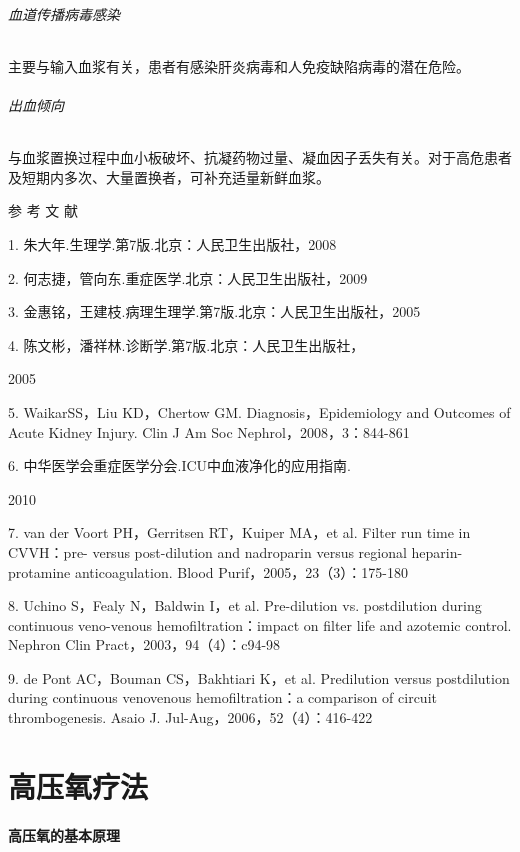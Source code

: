 \subparagraph{血道传播病毒感染}

主要与输入血浆有关，患者有感染肝炎病毒和人免疫缺陷病毒的潜在危险。

\subparagraph{出血倾向}

与血浆置换过程中血小板破坏、抗凝药物过量、凝血因子丢失有关。对于高危患者及短期内多次、大量置换者，可补充适量新鲜血浆。

\protect\hypertarget{text00394.html}{}{}

\hypertarget{text00394.htmlux5cux23CHP16-10-5}{}
参 考 文 献

1. 朱大年.生理学.第7版.北京：人民卫生出版社，2008

2. 何志捷，管向东.重症医学.北京：人民卫生出版社，2009

3. 金惠铭，王建枝.病理生理学.第7版.北京：人民卫生出版社，2005

4. 陈文彬，潘祥林.诊断学.第7版.北京：人民卫生出版社，

2005

5. WaikarSS，Liu KD，Chertow GM. Diagnosis，Epidemiology and Outcomes of
Acute Kidney Injury. Clin J Am Soc Nephrol，2008，3：844-861

6. 中华医学会重症医学分会.ICU中血液净化的应用指南.

2010

7. van der Voort PH，Gerritsen RT，Kuiper MA，et al. Filter run time in
CVVH：pre- versus post-dilution and nadroparin versus regional
heparin-protamine anticoagulation. Blood Purif，2005，23（3）：175-180

8. Uchino S，Fealy N，Baldwin I，et al. Pre-dilution vs. postdilution
during continuous veno-venous hemofiltration：impact on filter life and
azotemic control. Nephron Clin Pract，2003，94（4）：c94-98

9. de Pont AC，Bouman CS，Bakhtiari K，et al. Predilution versus
postdilution during continuous venovenous hemofiltration：a comparison
of circuit thrombogenesis. Asaio J. Jul-Aug，2006，52（4）：416-422

\protect\hypertarget{text00395.html}{}{}

\chapter{高压氧疗法}

\subsubsection{高压氧的基本原理}

